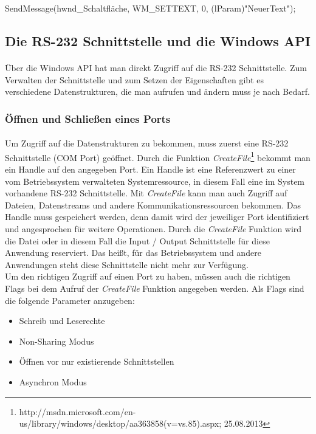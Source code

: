 \begin{center}
SendMessage(hwnd\_Schaltfläche, WM\_SETTEXT, 0, (lParam)"NeuerText");
\end{center}

\subsection{Die RS-232 Schnittstelle und die Windows API}\label{COMWINAPI}
\paragraph{}
Über die Windows API hat man direkt Zugriff auf die RS-232 Schnittstelle. Zum Verwalten der Schnittstelle und zum Setzen der Eigenschaften gibt es verschiedene Datenstrukturen, die man aufrufen und ändern muss je nach Bedarf.

\subsubsection{Öffnen und Schließen eines Ports}
\paragraph{}
Um Zugriff auf die Datenstrukturen zu bekommen, muss zuerst eine RS-232 Schnittstelle (COM Port) geöffnet. Durch die Funktion \textit{CreateFile}\footnote{http://msdn.microsoft.com/en-us/library/windows/desktop/aa363858(v=vs.85).aspx; 25.08.2013} bekommt man ein Handle auf den angegeben Port. Ein Handle ist eine Referenzwert zu einer vom Betriebssystem verwalteten Systemressource, in diesem Fall eine im System vorhandene RS-232 Schnittstelle. Mit \textit{CreateFile} kann man auch Zugriff auf Dateien, Datenstreams und andere Kommunikationsressourcen bekommen. Das Handle muss gespeichert werden, denn damit wird der jeweiliger Port identifiziert und angesprochen für weitere Operationen. Durch die \textit{CreateFile} Funktion wird die Datei oder in diesem Fall die Input / Output Schnittstelle für diese Anwendung reserviert. Das heißt, für das Betriebssystem und andere Anwendungen steht diese Schnittstelle nicht mehr zur Verfügung.
\\

Um den richtigen Zugriff auf einen Port zu haben, müssen auch die richtigen Flags bei dem Aufruf der \textit{CreateFile} Funktion angegeben werden. Als Flags sind die folgende Parameter anzugeben:
\begin{itemize}
\item Schreib und Leserechte
\item Non-Sharing Modus
\item Öffnen vor nur existierende Schnittstellen
\item Asynchron Modus
\end{itemize}

